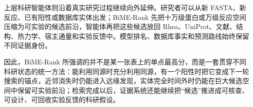 \documentclass[11pt,a4paper]{ctexart}
\begin{document}
上层科研智能体则沿着真实研究过程继续向外延伸。研究者可以从新 FASTA、新反应、已有阳性或数据库实体出发；BiME-Rank 先把十万级蛋白或万级反应空间压缩为可实验的候选前沿，智能体再把这些候选放回 Rhea、UniProt、文献、结构、热力学、宿主通量和实验反馈中。模型排名、数据库事实和预测路线始终保留不同证据身份。

因此，BiME-Rank 所强调的并不是某一张表上的单点最高分，而是一套贯穿不同科研状态的统一方法：能利用同源时充分利用同源，有一个阳性时把它变成下一轮搜索的锚点，近邻消失时仍能进入远缘发现，实体完全时间外时仍能在巨大候选空间中保留可实验前沿；检索完成以后，证据系统还能继续把“候选”推进成可核查、可设计、可回收实验反馈的科研假设。

\printbibliography[title={参考文献}]
\end{document}
